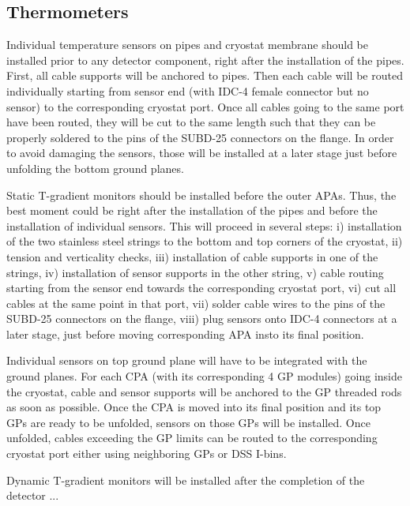 \subsection{Thermometers}
\label{sec:fdsp-slow-cryo-instal-th}


Individual temperature sensors on pipes and cryostat membrane should be installed prior to any detector component, right after the installation of the pipes.
First, all cable supports will be anchored to pipes. Then each cable will be routed individually starting from sensor end (with IDC-4 female connector but no sensor)
to the corresponding cryostat port. Once all cables going to the same port have been routed, they will be cut to the same length such that they can be properly soldered
to the pins of the SUBD-25 connectors on the flange. In order to avoid damaging the sensors, those will be installed at a later stage just before unfolding the bottom ground planes.

Static T-gradient monitors should be installed before the outer APAs. Thus, the best moment could be right after the installation of the pipes
and before the installation of individual sensors. This will proceed in several steps: i) installation of the two stainless steel strings to the bottom and top corners of the cryostat,
ii) tension and verticality checks, iii) installation of cable supports in one of the strings, iv) installation of sensor supports in the other string, v) cable routing starting from
the sensor end towards the corresponding cryostat port, vi) cut all cables at the same point in that port, vii) solder cable wires to the pins of the SUBD-25 connectors on the flange,
viii) plug sensors onto IDC-4 connectors at a later stage, just before moving corresponding APA insto its final position. 

Individual sensors on top ground plane will have to be integrated with the ground planes. For each CPA (with its corresponding 4 GP modules)
going inside the cryostat, cable and sensor supports will be anchored to the GP threaded rods as soon as possible.
Once the CPA is moved into its final position and its top GPs are ready to be unfolded, sensors on those GPs will be installed. Once unfolded, cables 
exceeding the GP limits can be routed to the corresponding cryostat port either using neighboring GPs or DSS I-bins. 


Dynamic T-gradient monitors will be installed after the completion of the detector ...



